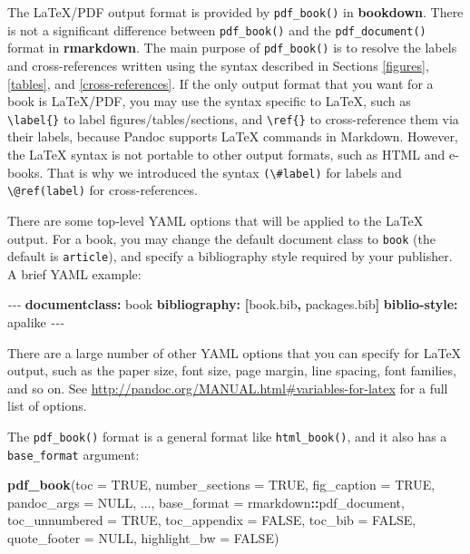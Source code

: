 \documentclass[
  12pt,
]{krantz}
\newenvironment{Shaded}{\begin{snugshade}}{\end{snugshade}}
\newcommand{\AttributeTok}[1]{\textcolor[rgb]{0.13,0.29,0.53}{#1}}
\newcommand{\ConstantTok}[1]{\textcolor[rgb]{0.56,0.35,0.01}{#1}}
\newcommand{\FunctionTok}[1]{\textcolor[rgb]{0.13,0.29,0.53}{\textbf{#1}}}
\newcommand{\KeywordTok}[1]{\textcolor[rgb]{0.13,0.29,0.53}{\textbf{#1}}}
\newcommand{\NormalTok}[1]{#1}
\newcommand{\PreprocessorTok}[1]{\textcolor[rgb]{0.56,0.35,0.01}{\textit{#1}}}
\newcommand{\SpecialCharTok}[1]{\textcolor[rgb]{0.81,0.36,0.00}{\textbf{#1}}}
\theoremstyle{definition}
\theoremstyle{definition}
\theoremstyle{definition}
\theoremstyle{definition}
\theoremstyle{remark}
\begin{document}
The LaTeX/PDF output format is provided by \texttt{pdf\_book()} in \textbf{bookdown}. There is not a significant difference between \texttt{pdf\_book()} and the \texttt{pdf\_document()} format in \textbf{rmarkdown}. The main purpose of \texttt{pdf\_book()} is to resolve the labels and cross-references written using the syntax described in Sections \ref{figures}, \ref{tables}, and \ref{cross-references}. If the only output format that you want for a book is LaTeX/PDF, you may use the syntax specific to LaTeX, such as \texttt{\textbackslash{}label\{\}} to label figures/tables/sections, and \texttt{\textbackslash{}ref\{\}} to cross-reference them via their labels, because Pandoc supports LaTeX commands in Markdown. However, the LaTeX syntax is not portable to other output formats, such as HTML and e-books. That is why we introduced the syntax \texttt{(\textbackslash{}\#label)} for labels and \texttt{\textbackslash{}@ref(label)} for cross-references.

There are some top-level YAML options that will be applied to the LaTeX output. For a book, you may change the default document class to \texttt{book} (the default is \texttt{article}), and specify a bibliography style required by your publisher. A brief YAML example:

\begin{Shaded}
\begin{Highlighting}[]
\PreprocessorTok{{-}{-}{-}}
\FunctionTok{documentclass}\KeywordTok{:}\AttributeTok{ book}
\FunctionTok{bibliography}\KeywordTok{:}\AttributeTok{ }\KeywordTok{[}\AttributeTok{book.bib}\KeywordTok{,}\AttributeTok{ packages.bib}\KeywordTok{]}
\FunctionTok{biblio{-}style}\KeywordTok{:}\AttributeTok{ apalike}
\PreprocessorTok{{-}{-}{-}}
\end{Highlighting}
\end{Shaded}

There are a large number of other YAML options that you can specify for LaTeX output, such as the paper size, font size, page margin, line spacing, font families, and so on. See \url{http://pandoc.org/MANUAL.html\#variables-for-latex} for a full list of options.

The \texttt{pdf\_book()} format is a general format like \texttt{html\_book()}, and it also has a \texttt{base\_format} argument:

\begin{Shaded}
\begin{Highlighting}[]
\FunctionTok{pdf\_book}\NormalTok{(}\AttributeTok{toc =} \ConstantTok{TRUE}\NormalTok{, }\AttributeTok{number\_sections =} \ConstantTok{TRUE}\NormalTok{, }\AttributeTok{fig\_caption =} \ConstantTok{TRUE}\NormalTok{,}
  \AttributeTok{pandoc\_args =} \ConstantTok{NULL}\NormalTok{, ..., }\AttributeTok{base\_format =}\NormalTok{ rmarkdown}\SpecialCharTok{::}\NormalTok{pdf\_document,}
  \AttributeTok{toc\_unnumbered =} \ConstantTok{TRUE}\NormalTok{, }\AttributeTok{toc\_appendix =} \ConstantTok{FALSE}\NormalTok{, }\AttributeTok{toc\_bib =} \ConstantTok{FALSE}\NormalTok{,}
  \AttributeTok{quote\_footer =} \ConstantTok{NULL}\NormalTok{, }\AttributeTok{highlight\_bw =} \ConstantTok{FALSE}\NormalTok{)}
\end{Highlighting}
\end{Shaded}
\end{document}
